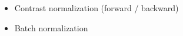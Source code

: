 \begin{itemize}
 \item Contrast normalization (forward / backward)
 \item Batch normalization
\end{itemize}
